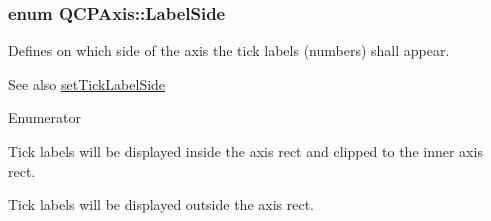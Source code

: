 \subsubsection[{\texorpdfstring{Label\+Side}{LabelSide}}]{\setlength{\rightskip}{0pt plus 5cm}enum {\bf Q\+C\+P\+Axis\+::\+Label\+Side}}\hypertarget{classQCPAxis_a24b13374b9b8f75f47eed2ea78c37db9}{}\label{classQCPAxis_a24b13374b9b8f75f47eed2ea78c37db9}
Defines on which side of the axis the tick labels (numbers) shall appear.

\begin{DoxySeeAlso}{See also}
\hyperlink{classQCPAxis_a13ec644fc6e22715744c92c6dfa4f0fa}{set\+Tick\+Label\+Side} 
\end{DoxySeeAlso}
\begin{Desc}
\item[Enumerator]\par
\begin{description}
\item[{\em 
ls\+Inside\hypertarget{classQCPAxis_a24b13374b9b8f75f47eed2ea78c37db9aae7b027ac2839cf4ad611df30236fc3f}{}\label{classQCPAxis_a24b13374b9b8f75f47eed2ea78c37db9aae7b027ac2839cf4ad611df30236fc3f}
}]Tick labels will be displayed inside the axis rect and clipped to the inner axis rect. \item[{\em 
ls\+Outside\hypertarget{classQCPAxis_a24b13374b9b8f75f47eed2ea78c37db9a2eadb509fc0c9a8b35b85c86ec9f3c7a}{}\label{classQCPAxis_a24b13374b9b8f75f47eed2ea78c37db9a2eadb509fc0c9a8b35b85c86ec9f3c7a}
}]Tick labels will be displayed outside the axis rect. \end{description}
\end{Desc}

